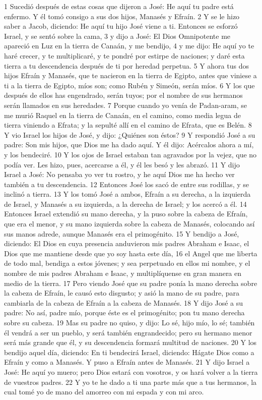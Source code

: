 1  Sucedió después de estas cosas que dijeron a José: He aquí tu padre está enfermo. Y él tomó consigo a sus dos hijos, Manasés y Efraín.
2 Y se le hizo saber a Jacob, diciendo: He aquí tu hijo José viene a ti. Entonces se esforzó Israel, y se sentó sobre la cama,
3 y dijo a José: El Dios Omnipotente me apareció en Luz en la tierra de Canaán, y me bendijo,
4 y me dijo: He aquí yo te haré crecer, y te multiplicaré, y te pondré por estirpe de naciones; y daré esta tierra a tu descendencia después de ti por heredad perpetua.
5 Y ahora tus dos hijos Efraín y Manasés, que te nacieron en la tierra de Egipto, antes que viniese a ti a la tierra de Egipto, míos son; como Rubén y Simeón, serán míos.
6 Y los que después de ellos has engendrado, serán tuyos; por el nombre de sus hermanos serán llamados en sus heredades.
7 Porque cuando yo venía de Padan-aram, se me murió Raquel en la tierra de Canaán, en el camino, como media legua de tierra viniendo a Efrata; y la sepulté allí en el camino de Efrata, que es Belén.
8 Y vio Israel los hijos de José, y dijo: ¿Quiénes son éstos?
9 Y respondió José a su padre: Son mis hijos, que Dios me ha dado aquí. Y él dijo: Acércalos ahora a mí, y los bendeciré.
10 Y los ojos de Israel estaban tan agravados por la vejez, que no podía ver. Les hizo, pues, acercarse a él, y él les besó y les abrazó.
11 Y dijo Israel a José: No pensaba yo ver tu rostro, y he aquí Dios me ha hecho ver también a tu descendencia.
12 Entonces José los sacó de entre sus rodillas, y se inclinó a tierra.
13 Y los tomó José a ambos, Efraín a su derecha, a la izquierda de Israel, y Manasés a su izquierda, a la derecha de Israel; y los acercó a él.
14 Entonces Israel extendió su mano derecha, y la puso sobre la cabeza de Efraín, que era el menor, y su mano izquierda sobre la cabeza de Manasés, colocando así sus manos adrede, aunque Manasés era el primogénito.
15 Y bendijo a José, diciendo: El Dios en cuya presencia anduvieron mis padres Abraham e Isaac, el Dios que me mantiene desde que yo soy hasta este día,
16 el Angel que me liberta de todo mal, bendiga a estos jóvenes; y sea perpetuado en ellos mi nombre, y el nombre de mis padres Abraham e Isaac, y multiplíquense en gran manera en medio de la tierra.
17 Pero viendo José que su padre ponía la mano derecha sobre la cabeza de Efraín, le causó esto disgusto; y asió la mano de su padre, para cambiarla de la cabeza de Efraín a la cabeza de Manasés.
18 Y dijo José a su padre: No así, padre mío, porque éste es el primogénito; pon tu mano derecha sobre su cabeza.
19 Mas su padre no quiso, y dijo: Lo sé, hijo mío, lo sé; también él vendrá a ser un pueblo, y será también engrandecido; pero su hermano menor será más grande que él, y su descendencia formará multitud de naciones.
20 Y los bendijo aquel día, diciendo: En ti bendecirá Israel, diciendo: Hágate Dios como a Efraín y como a Manasés. Y puso a Efraín antes de Manasés.
21 Y dijo Israel a José: He aquí yo muero; pero Dios estará con vosotros, y os hará volver a la tierra de vuestros padres.
22 Y yo te he dado a ti una parte más que a tus hermanos, la cual tomé yo de mano del amorreo con mi espada y con mi arco.

